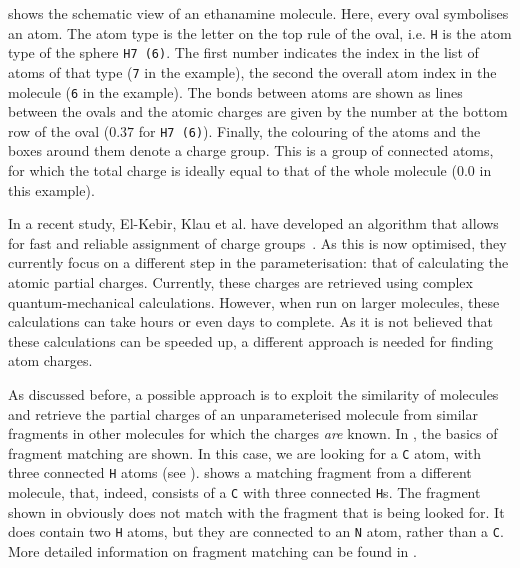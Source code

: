  shows the schematic view of an ethanamine molecule. Here, every oval symbolises an atom. The atom type is the letter on the top rule of the oval, i.e. \verb|H| is the atom type of the sphere \verb|H7 (6)|. The first number indicates the index in the list of atoms of that type (\verb|7| in the example), the second the overall atom index in the molecule (\verb|6| in the example). The bonds between atoms are shown as lines between the ovals and the atomic charges are given by the number at the bottom row of the oval ($0.37$ for \verb|H7 (6)|). Finally, the colouring of the atoms and the boxes around them denote a charge group. This is a group of connected atoms, for which the total charge is ideally equal to that of the whole molecule ($0.0$ in this example).

In a recent study, El-Kebir, Klau et al. have developed an algorithm that allows for fast and reliable assignment of charge groups~\cite{canzar2012charge}. As this is now optimised, they currently focus on a different step in the parameterisation: that of calculating the atomic partial charges. Currently, these charges are retrieved using complex quantum-mechanical calculations. However, when run on larger molecules, these calculations can take hours or even days to complete. As it is not believed that these calculations can be speeded up, a different approach is needed for finding atom charges.

As discussed before, a possible approach is to exploit the similarity of molecules and retrieve the partial charges of an unparameterised molecule from similar fragments in other molecules for which the charges \emph{are} known. In , the basics of fragment matching are shown. In this case, we are looking for a \verb|C| atom, with three connected \verb|H| atoms (see ).  shows a matching fragment from a different molecule, that, indeed, consists of a \verb|C| with three connected \verb|H|s. The fragment shown in  obviously does not match with the fragment that is being looked for. It does contain two \verb|H| atoms, but they are connected to an \verb|N| atom, rather than a \verb|C|. More detailed information on fragment matching can be found in .

